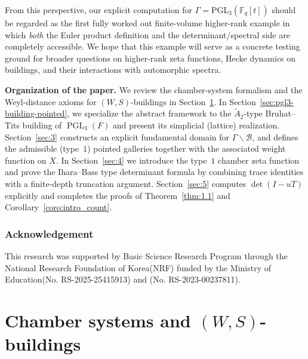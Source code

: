 \documentclass[11pt]{amsart}
\theoremstyle{definition}
\theoremstyle{remark}
\numberwithin{equation}{section}
\begin{document}
From this perspective, our explicit computation for
$\Gamma=\mathrm{PGL}_{3}(\mathbb{F}_{q}[t])$ should be regarded as the first
fully worked out finite-volume higher-rank example in which
\emph{both} the Euler product definition and the determinant/spectral side are
completely accessible.
We hope that this example will serve as a concrete testing ground for broader
questions on higher-rank zeta functions, Hecke dynamics on buildings, and their
interactions with automorphic spectra.


\medskip

\noindent\textbf{Organization of the paper.}
We review the chamber-system formalism and the Weyl-distance axioms for $(W,S)$-buildings in Section~\ref{sec:chamber-system-building}. In Section~\ref{sec:pgl3-building-pointed}, we specialize the abstract framework to the $\widetilde{A}_2$-type Bruhat--Tits building of $\operatorname{PGL}_3(F)$ and present its simplicial (lattice) realization.
Section~\ref{sec:3} constructs an explicit fundamental domain for $\Gamma\backslash\mathcal{B}$, and defines the admissible (type~$1$) pointed galleries together with the associated weight function on $X$. In Section~\ref{sec:4} we introduce the type~$1$ chamber zeta function and prove the Ihara--Bass type determinant formula by combining trace identities with a finite-depth truncation argument. Section~\ref{sec:5} computes $\det(I-uT)$ explicitly and completes the proofs of Theorem~\ref{thm:1.1} and Corollary~\ref{coro:intro_count}.



\subsubsection*{Acknowledgement} This research was supported by Basic Science Research Program through the National Research Foundation of Korea(NRF) funded by the Ministry of Education(No. RS-2025-25415913) and (No. RS-2023-00237811). 


%
\section{Chamber systems and \texorpdfstring{$(W,S)$}{(W,S)}-buildings}\label{sec:chamber-system-building}
\end{document}
